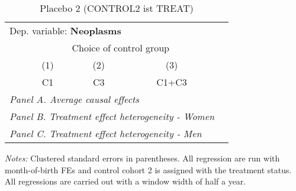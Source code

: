  \begin{table}[H] \centering \begin{threeparttable} \caption{Placebo 2 (CONTROL2 ist TREAT) } {\def\sym#1{\ifmmode^{#1}\else\(^{#1}\)\fi} \begin{tabular}{l*{4}{c}} \toprule \multicolumn{4}{l}{Dep. variable: \textbf{Neoplasms}} \\ & \multicolumn{3}{c}{Choice of control group} \\ \cmidrule(lr){2-4}
            &\multicolumn{1}{c}{(1)}&\multicolumn{1}{c}{(2)}&\multicolumn{1}{c}{(3)}\\
            &\multicolumn{1}{c}{C1}&\multicolumn{1}{c}{C3}&\multicolumn{1}{c}{C1+C3}\\
\midrule
 \multicolumn{4}{l}{\emph{Panel A. Average causal effects}} \\      \midrule\multicolumn{4}{l}{\emph{Panel B. Treatment effect heterogeneity - Women}} \\      \midrule\multicolumn{4}{l}{\emph{Panel C. Treatment effect heterogeneity - Men}} \\      
\bottomrule \end{tabular} } \begin{tablenotes} \item \scriptsize \emph{Notes:} Clustered standard errors in parentheses. All regression are run with month-of-birth FEs and control cohort 2 is assigned with the treatment status. All regressions are carried out with a window width of half a year. \end{tablenotes} \end{threeparttable} \end{table} 
